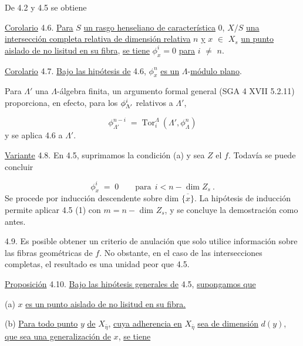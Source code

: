 De 4.2 y 4.5 se obtiene

\underline{Corolario} 4.6.  \underline{Para} $S$ \underline{un rasgo henseliano de característica} 0, $X/S$ \underline{una intersección completa relativa de dimensión relativa} $n$ \underline{y} $x$ $\in$ $X_s$ \underline{un punto aislado de no lisitud en su fibra}, \underline{se tiene} $\phi^i_x = 0$ \underline{para} $i$ $\neq$ $n$.

\underline{Corolario} 4.7.  \underline{Bajo las hipótesis de} 4.6, $\phi^n_x$ \underline{es un} $\Lambda$-\underline{módulo plano}.

Para $\Lambda'$ una $\Lambda$-álgebra finita, un argumento formal general (SGA 4 XVII 5.2.11) proporciona, en efecto, para los $\phi^i_{\Lambda'}$ relativos a $\Lambda'$,



\begin{equation*}
\phi^{n-i}_{\Lambda'} \;=\; \mathrm{Tor}^{\Lambda}_{i}\ (\Lambda',\phi^n_{\Lambda})
\end{equation*}
y se aplica 4.6 a $\Lambda'$.

\underline{Variante} 4.8.  En 4.5, suprimamos la condición (a) y sea $Z$ el  $f$. Todavía se puede concluir

\begin{equation*}
\phi^i_x \;=\; 0 \qquad \text{para}\ \ i < n - \dim Z_s\ .
\end{equation*}
Se procede por inducción descendente sobre dim $\overline{\{x\}}$. La hipótesis de inducción permite aplicar 4.5 (1) con $m = n -$ dim $Z_s$, y se concluye la demostración como antes.

4.9.  Es posible obtener un criterio de anulación que solo utilice información sobre las fibras geométricas de $f$. No obstante, en el caso de las intersecciones completas, el resultado es una unidad peor que 4.5.

\underline{Proposición} 4.10.  \underline{Bajo las hipótesis generales de} 4.5, \underline{supongamos que}

(a)  $x$ \underline{es un punto aislado de no lisitud en su fibra.}

(b) \underline{Para todo punto} $y$ \underline{de} $X_{\bar{\eta}}$, \underline{cuya adherencia en} $X_{\bar{\eta}}$ \underline{sea de dimensión} $d(y)$, \underline{que sea una generalización de} $x$, \underline{se tiene} 

